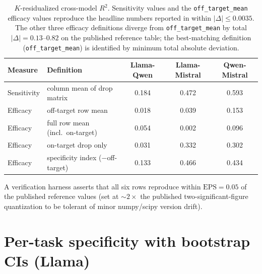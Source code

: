 \documentclass{article}
\theoremstyle{plain}
\theoremstyle{definition}
\theoremstyle{remark}
\begin{document}
\begin{table}[h]
\centering
\small
\begin{tabular}{llccc}
\toprule
\textbf{Measure} & \textbf{Definition} & \textbf{Llama-Qwen} & \textbf{Llama-Mistral} & \textbf{Qwen-Mistral} \\
\midrule
Sensitivity & column mean of drop matrix     & 0.184 & 0.472 & 0.593 \\
Efficacy    & off-target row mean              & 0.018 & 0.039 & 0.153 \\
Efficacy    & full row mean (incl.\ on-target) & 0.054 & 0.002 & 0.096 \\
Efficacy    & on-target drop only              & 0.031 & 0.332 & 0.302 \\
Efficacy    & specificity index ($-$off-target) & 0.133 & 0.466 & 0.434 \\
\bottomrule
\end{tabular}
\caption{$K$-residualized cross-model $R^2$. Sensitivity values and the \texttt{off\_target\_mean} efficacy values reproduce the headline numbers reported in  within $|\Delta| \leq 0.0035$. The other three efficacy definitions diverge from \texttt{off\_target\_mean} by total $|\Delta|=0.13$--$0.82$ on the published reference table; the best-matching definition (\texttt{off\_target\_mean}) is identified by minimum total absolute deviation.}
\label{tab:kfe-full}
\end{table}

A verification harness asserts that all six rows reproduce within $\text{EPS}=0.05$ of the published reference values (set at $\sim 2\times$ the published two-significant-figure quantization to be tolerant of minor numpy/scipy version drift).

\section{Per-task specificity with bootstrap CIs (Llama)}
\label{app:specificity}
\end{document}
